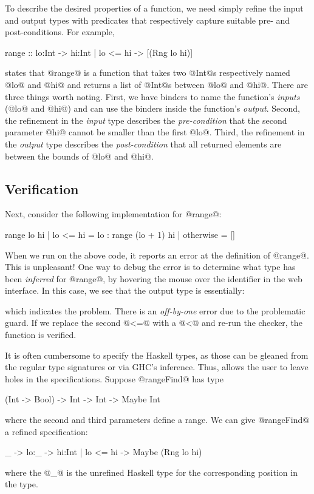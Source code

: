 To describe the desired properties of a function, we need
simply refine the input and output types with predicates 
that respectively capture suitable pre- and post-conditions. 
For example,
%
\begin{code}
  range :: lo:Int -> hi:{Int | lo <= hi} -> [(Rng lo hi)]
\end{code}
%
states that @range@ is a function that takes two @Int@s 
respectively named @lo@ and @hi@ and returns a list of @Int@s 
between @lo@ and @hi@. There are three things worth
noting.
%
First, we have binders to name the function's \emph{inputs} 
(\eg @lo@ and @hi@) and can use the binders inside the 
function's \emph{output}.
%
Second, the refinement in the \emph{input} type describes the 
\emph{pre-condition} that the second parameter @hi@ cannot 
be smaller than the first @lo@.
%
Third, the refinement in the \emph{output} type describes the
\emph{post-condition} that all returned elements are between 
the bounds of @lo@ and @hi@.


\subsection{Verification}\label{sec:tool:verification}

Next, consider the following implementation for @range@:
%
\begin{code}
  range lo hi 
    | lo <= hi  = lo : range (lo + 1) hi
    | otherwise = []
\end{code}
%
When we run \toolname on the above code, it reports an 
error at the definition of @range@. This is unpleasant! 
One way to debug the error is to determine what type has
been \emph{inferred} for @range@, \eg by hovering the 
mouse over the identifier in the web interface. 
In this case, we see that the output type is essentially:
%
\begin{code}
  [{v:Int | lo <= v && v <= hi}]
\end{code}
%
which indicates the problem. There is an \emph{off-by-one} 
error due to the problematic guard. If we replace the second @<=@ 
with a @<@ and re-run the checker, the function is verified.

 It is often cumbersome to specify the Haskell
types, as those can be gleaned from the regular type signatures 
or via GHC's inference. Thus, \toolname allows the user to leave 
holes in the specifications. Suppose @rangeFind@ has type 
%
\begin{code}
  (Int -> Bool) -> Int -> Int -> Maybe Int
\end{code}
%
where the second and third parameters define a range. 
We can give @rangeFind@ a refined specification:
%
\begin{code}
  _ -> lo:_ -> hi:{Int | lo <= hi} -> Maybe (Rng lo hi)
\end{code}
%
where the @_@ is the unrefined Haskell type for the 
corresponding position in the type.


